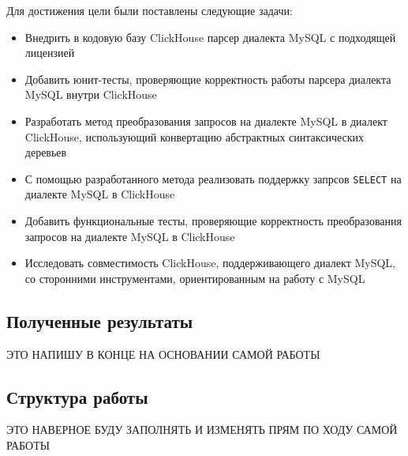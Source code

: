 Для достижения цели были поставлены следующие задачи:
\begin{itemize}
  \item Внедрить в кодовую базу ClickHouse парсер диалекта MySQL с подходящей лицензией
  \item Добавить юнит-тесты, проверяющие корректность работы парсера диалекта MySQL внутри ClickHouse
  \item Разработать метод преобразования запросов на диалекте MySQL в диалект ClickHouse, использующий конвертацию абстрактных синтаксических деревьев
  \item С помощью разработанного метода реализовать поддержку запрсов \lstinline[style=customsql]|SELECT| на диалекте MySQL в ClickHouse
  \item Добавить функциональные тесты, проверяющие корректность преобразования запросов на диалекте MySQL в ClickHouse
  \item Исследовать совместимость ClickHouse, поддерживающего диалект MySQL, со сторонними инструментами, ориентированным на работу с MySQL
\end{itemize}

\subsection{Полученные результаты}
ЭТО НАПИШУ В КОНЦЕ НА ОСНОВАНИИ САМОЙ РАБОТЫ

\subsection{Структура работы}
ЭТО НАВЕРНОЕ БУДУ ЗАПОЛНЯТЬ И ИЗМЕНЯТЬ ПРЯМ ПО ХОДУ САМОЙ РАБОТЫ

